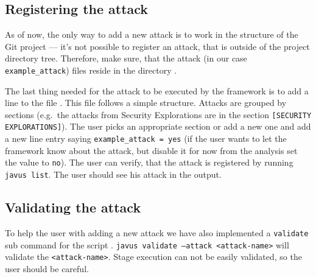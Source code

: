     \subsection{Registering the attack}
    As of now, the only way to add a new attack is to work in the structure of the Git project --- it's not possible to register an attack, that is outside of the project directory tree. Therefore, make sure, that the attack (in our case \texttt{example_attack}) files reside in the directory .

    The last thing needed for the attack to be executed by the framework is to add a line to the file . This file follows a simple structure. Attacks are grouped by sections (e.g.\ the attacks from Security Explorations are in the section \texttt{[SECURITY EXPLORATIONS]}). The user picks an appropriate section or add a new one and add a new line entry saying \texttt{example_attack = yes} (if the user wants to let the framework know about the attack, but disable it for now from the analysis set the value to \texttt{no}). The user can verify, that the attack is registered by running \texttt{javus list}. The user should see his attack in the output.

    \subsection{Validating the attack}
    To help the user with adding a new attack we have also implemented a \texttt{validate} sub command for the script \javus. \texttt{javus validate --attack <attack-name>} will validate the \texttt{<attack-name>}. Stage execution can not be easily validated, so the user should be careful.
